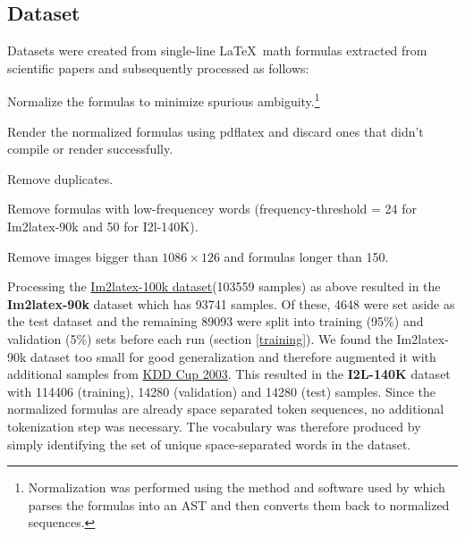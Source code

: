 \documentclass{article}
\begin{document}

\subsection{Dataset}
\label{dataset}
Datasets were created from single-line \LaTeX ~math formulas extracted from scientific papers and subsequently processed as follows:
\begin{enumerate*}[label=\arabic*)]
	\item Normalize the formulas to minimize spurious ambiguity.\footnote{Normalization was performed using the method and software used by \cite{Deng2017ImagetoMarkupGW} which parses the formulas into an AST and then converts them back to normalized sequences.}
	\item Render the normalized formulas using pdflatex and discard ones that didn't compile or render successfully.
	\item Remove duplicates.
	\item Remove formulas with low-frequencey words (frequency-threshold = 24 for Im2latex-90k and 50 for I2l-140K).
	\item Remove images bigger than $1086 \times 126$ and formulas longer than 150.
\end{enumerate*}
Processing the \href{https://zenodo.org/record/56198\#.WnzcT3UbMQ9}{Im2latex-100k dataset}\footnotemark[104] (103559 samples) as above resulted in the \textbf{Im2latex-90k} dataset which has 93741 samples. Of these, 4648 were set aside as the test dataset and the remaining 89093 were split into training (95\%) and validation (5\%) sets before each run (section \ref{training}).
We found the {Im2latex-90k} dataset too small for good generalization and therefore augmented it with additional samples from \href{http://www.cs.cornell.edu/projects/kddcup/datasets.html}{KDD Cup 2003}. This resulted in the \textbf{I2L-140K} dataset with 114406 (training), 14280 (validation) and 14280 (test) samples. Since the normalized formulas are already space separated token sequences, no additional tokenization step was necessary. The vocabulary was therefore produced by simply identifying the set of unique space-separated words in the dataset.
\end{document}
